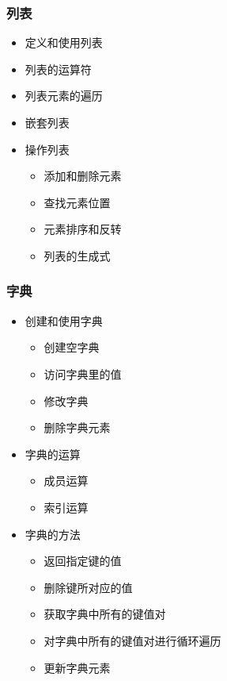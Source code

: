 \documentclass[10pt]{elegantnote}
\begin{document}
\begin{sloppypar}
\subsubsection{列表}
    \begin{itemize}
      \item 定义和使用列表
      \item 列表的运算符
      \item 列表元素的遍历
      \item 嵌套列表
      \item 操作列表
      \begin{itemize}
        \item 添加和删除元素
        \item 查找元素位置
        \item 元素排序和反转
        \item 列表的生成式
      \end{itemize}
    \end{itemize}
\subsubsection{字典}
    \begin{itemize}
      \item 创建和使用字典
        \begin{itemize}
          \item 创建空字典
          \item 访问字典里的值
          \item 修改字典
          \item 删除字典元素
        \end{itemize}
      \item 字典的运算
        \begin{itemize}
          \item 成员运算
          \item 索引运算
        \end{itemize}
      \item 字典的方法
        \begin{itemize}
          \item 返回指定键的值
          \item 删除键所对应的值
          \item 获取字典中所有的键值对
          \item 对字典中所有的键值对进行循环遍历
          \item 更新字典元素
        \end{itemize}
    \end{itemize}


\end{sloppypar}
\end{document}
